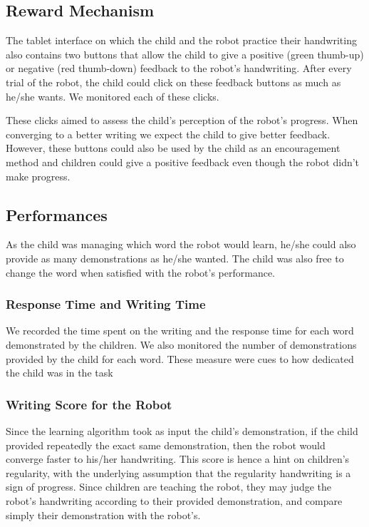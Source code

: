 \documentclass[letterpaper, 10 pt, conference]{ieeeconf}  %
\begin{document}

\subsection{Reward Mechanism}
The tablet interface on which the child and the robot practice their handwriting also contains two buttons that allow the child to give a positive (green thumb-up) or negative (red thumb-down) feedback to the robot's handwriting.
After every trial of the robot, the child could click on these feedback buttons as much as he/she wants.
We monitored each of these clicks.

These clicks aimed to assess the child's perception of the robot's progress.
When converging to a better writing we expect the child to give better feedback.
However, these buttons could also be used by the child as an encouragement method and children could give a positive feedback even though the robot didn't make progress.

\subsection{Performances}
As the child was managing which word the robot would learn, he/she could also provide as many demonstrations as he/she wanted.
The child was also free to change the word when satisfied with the robot's performance.

\subsubsection{Response Time and Writing Time}
We recorded the time spent on the writing and the response time for each word demonstrated by the children.
We also monitored the number of demonstrations provided by the child for each word.
These measure were cues to how dedicated the child was in the task 

\subsubsection{Writing Score for the Robot}
Since the learning algorithm took as input the child's demonstration, if the child provided repeatedly the exact same demonstration, then the robot would converge faster to his/her handwriting.
This score is hence a hint on children's regularity, with the underlying assumption that the regularity handwriting is a sign of progress.
Since children are teaching the robot, they may judge the robot's handwriting according to their provided demonstration, and compare simply their demonstration with the robot's.
\end{document}
